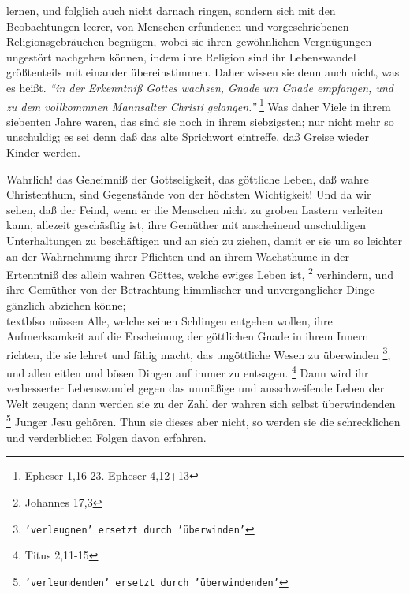 {lernen, und folglich auch nicht darnach ringen, sondern sich mit den
Beobachtungen leerer, von Menschen erfundenen und vorgeschriebenen
Religionsgebräuchen begnügen, wobei sie ihren gewöhnlichen Vergnügungen
ungestört nachgehen können, indem ihre Religion sind ihr Lebenswandel
größtenteils mit einander übereinstimmen. Daher wissen sie denn auch nicht, was
es heißt.
\textit{"`in der Erkenntniß Gottes wachsen, Gnade um Gnade empfangen, und zu
dem vollkommnen Mannsalter Christi gelangen."'}
\footnote{Epheser 1,16-23. Epheser 4,12+13}
Was daher Viele in ihrem siebenten Jahre waren, das sind sie noch in
ihrem siebzigsten; nur nicht mehr so unschuldig; es sei denn daß das alte
Sprichwort eintreffe, daß Greise wieder Kinder werden.

\medskip

Wahrlich! das Geheimniß der Gottseligkeit, das göttliche
Leben, daß wahre
Christenthum, sind Gegenstände von der höchsten Wichtigkeit! Und da wir sehen,
daß der Feind, wenn er die Menschen nicht zu groben Lastern verleiten kann,
allezeit geschäsftig ist, ihre Gemüther mit anscheinend unschuldigen
Unterhaltungen zu beschäftigen und an sich zu ziehen, damit er sie um so
leichter an der Wahrnehmung ihrer Pflichten und an ihrem Wachsthume in der
Ertenntniß des allein wahren Göttes, welche ewiges Leben ist,
\footnote{Johannes 17,3}
verhindern, und ihre Gemüther von der Betrachtung himmlischer und
unverganglicher Dinge gänzlich abziehen könne;\\textbf{so müssen Alle, welche
seinen
Schlingen entgehen wollen, ihre Aufmerksamkeit auf die Erscheinung der
göttlichen Gnade in ihrem Innern richten, die sie lehret und fähig
macht, das
ungöttliche Wesen zu überwinden
\footnote{\texttt{'verleugnen' ersetzt durch 'überwinden'}}, und allen eitlen
und bösen Dingen auf immer zu
entsagen.}
\footnote{Titus 2,11-15}
Dann wird ihr verbesserter Lebenswandel gegen
das unmäßige und ausschweifende Leben der Welt zeugen; dann werden sie zu der
Zahl der wahren sich selbst überwindenden
\footnote{\texttt{'verleundenden' ersetzt durch 'überwindenden'}} Junger Jesu
gehören. Thun sie dieses
aber nicht, so werden sie die schrecklichen und verderblichen Folgen davon
erfahren.

\medskip

}
